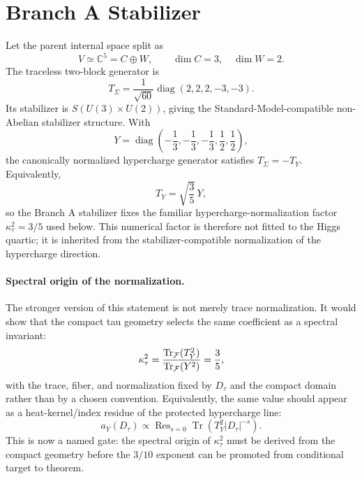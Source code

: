 \documentclass[11pt]{article}
\begin{document}
\section{Branch A Stabilizer}
Let the parent internal space split as
\begin{equation}
V\simeq \mathbb{C}^5=C\oplus W,\qquad \dim C=3,\quad \dim W=2 .
\end{equation}
The traceless two-block generator is
\begin{equation}
T_\Sigma=\frac1{\sqrt{60}}\operatorname{diag}(2,2,2,-3,-3).
\end{equation}
Its stabilizer is $S(U(3)\times U(2))$, giving the Standard-Model-compatible non-Abelian stabilizer structure. With
\begin{equation}
Y=\operatorname{diag}\left(-\frac13,-\frac13,-\frac13,\frac12,\frac12\right),
\end{equation}
the canonically normalized hypercharge generator satisfies $T_\Sigma=-T_Y$.
Equivalently,
\begin{equation}
T_Y=\sqrt{\frac35}\,Y ,
\end{equation}
so the Branch A stabilizer fixes the familiar hypercharge-normalization factor
$\kappa_\tau^2=3/5$ used below. This numerical factor is therefore not fitted
to the Higgs quartic; it is inherited from the stabilizer-compatible
normalization of the hypercharge direction.

\paragraph{Spectral origin of the normalization.}
The stronger version of this statement is not merely trace normalization.  It
would show that the compact tau geometry selects the same coefficient as a
spectral invariant:
\begin{equation}
\kappa_\tau^2
=
\frac{\operatorname{Tr}_{\cal F}(T_Y^2)}{\operatorname{Tr}_{\cal F}(Y^2)}
=\frac35 ,
\end{equation}
with the trace, fiber, and normalization fixed by $D_\tau$ and the compact
domain rather than by a chosen convention.  Equivalently, the same value should
appear as a heat-kernel/index residue of the protected hypercharge line:
\begin{equation}
a_Y(D_\tau)
\propto
\operatorname{Res}_{s=0}
\operatorname{Tr}\!\left(T_Y^2|D_\tau|^{-s}\right).
\end{equation}
This is now a named gate: the spectral origin of $\kappa_\tau^2$ must be
derived from the compact geometry before the $3/10$ exponent can be promoted
from conditional target to theorem.
\end{document}

